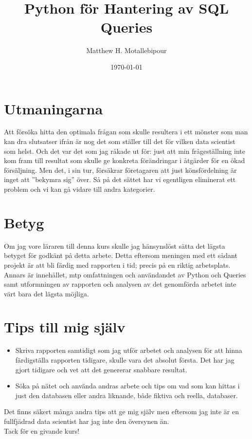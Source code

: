 \documentclass[10pt]{article}
\begin{document}

\title{Python för Hantering av SQL Queries}
\author{Matthew H. Motallebipour}
\date{\today}
\maketitle

\section{Utmaningarna}

Att försöka hitta den optimala frågan som skulle resultera i ett mönster som man kan dra slutsatser ifrån är nog det som ställer till det för vilken data scientist som helst. Och det var det som jag råkade ut för: just att min frågeställning inte kom fram till resultat som skulle ge konkreta förändringar i åtgärder för en ökad försäljning. Men det, i sin tur, försäkrar företagaren att just könsfördelning är inget att ''bekymra sig'' över. Så på det sättet har vi egentligen eliminerat ett problem och vi kan gå vidare till andra kategorier.

\section{Betyg}

Om jag vore läraren till denna kurs skulle jag hänsynslöst sätta det lägsta betyget för godkänt på detta arbete. Detta eftersom meningen med ett sådant projekt är att bli färdig med rapporten i tid; precis på en riktig arbetsplats. Annars är innehållet, mtp omfattningen och användandet av Python och Queries samt utformningen av rapporten och analysen av det genomförda arbetet inte värt bara det lägsta möjliga.

\section{Tips till mig själv}

\begin{itemize}
	\item Skriva rapporten samtidigt som jag utför arbetet och analysen för att hinna färdigställa rapporten tidigare, skulle vara det absolut första. Det har jag gjort tidigare och vet att det genererar snabbare resultat.
	\item Söka på nätet och använda andras arbete och tips om vad som kan hittas i just den databasen eller andra liknande, både fiktiva och reella, databaser.
\end{itemize}

\noindent Det finns säkert många andra tips att ge mig själv men eftersom jag inte är en fullfjädrad data scientist har jag inte den översynen än.\\

\noindent Tack för en givande kurs!
\end{document}
